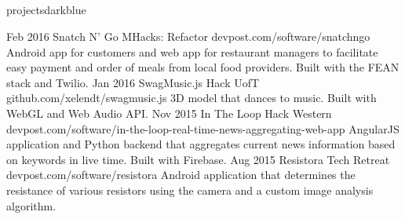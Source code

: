 \documentclass{resume}
\begin{document}
\begin{main}
		\section{\faFolder}{projects}{darkblue}
			\begin{entrylist}
				\rightentry%
					{Feb 2016}%
					{Snatch N' Go}%
					{MHacks: Refactor}%
					{devpost.com/software/snatchngo}%
					{Android app for customers and web app for restaurant managers to facilitate easy payment and order of meals from local food providers. Built with the FEAN stack and Twilio.}
				\rightentry%
					{Jan 2016}%
					{SwagMusic.js}%
					{Hack UofT}%
					{github.com/xelendt/swagmusic.js}%
					{3D model that dances to music. Built with WebGL and Web Audio API.}
				\rightentry%
					{Nov 2015}%
					{In The Loop}%
					{Hack Western}%
					{devpost.com/software/in-the-loop-real-time-news-aggregating-web-app}%
					{AngularJS application and Python backend that aggregates current news information based on keywords in live time. Built with Firebase.}
				\rightentry%
					{Aug 2015}%
					{Resistora}%
					{Tech Retreat}%
					{devpost.com/software/resistora}%
					{Android application that determines the resistance of various resistors using the camera and a custom image analysis algorithm.}
			\end{entrylist}	
	\end{main}
\end{document}
